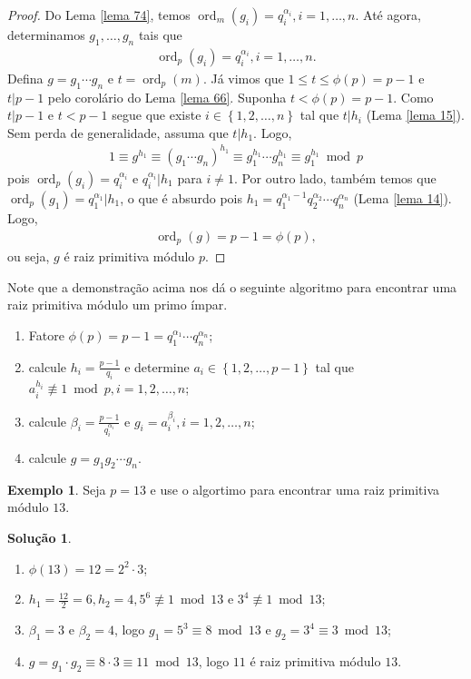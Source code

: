\documentclass[a4paper,11pt,twoside, leqno]{article}
\DeclareMathOperator{\Ord}{ord}
\theoremstyle{definition}
\newtheorem*{example}{Exemplo}
\newtheorem*{solution}{Solução}
\begin{document}
\begin{proof}
	Do Lema \eqref{lema 74}, temos $\Ord_m(g_i) = q_i^{\alpha_i}, i=1,\dots,n$. Até agora, determinamos $g_1, \dots, g_n$ tais que
	\begin{align*}
	\Ord_p(g_i) = q_i^{\alpha_i}, i=1,\dots,n.
	\end{align*}
	Defina $g = g_1\cdots g_n$ e $t = \Ord_p(m)$. Já vimos que $1\leq t\leq \phi(p) = p-1$ e $t|p-1$ pelo corolário do Lema \eqref{lema 66}. Suponha $t<\phi(p) = p-1$. Como $t|p-1$ e $t<p-1$ segue que existe $i\in\left\{ 1,2,\dots,n \right\}$ tal que $t|h_i$ (Lema \eqref{lema 15}). Sem perda de generalidade, assuma que $t|h_1$. Logo,
	\begin{align*}
	1\equiv g^{h_1}\equiv (g_1\cdots g_n)^{h_1}\equiv g_1^{h_1}\cdots g_n^{h_1}\equiv g_1^{h_1}\bmod p
	\end{align*}
	pois $\Ord_p(g_i) = q_i^{\alpha_i}$ e $q_i^{\alpha_i}|h_1$ para $i\neq 1$. Por outro lado, também temos que $\Ord_p(g_1) = q_1^{\alpha_1}|h_1$, o que é absurdo pois $h_1 = q_1^{\alpha_1 - 1}q_2^{\alpha_2}\cdots q_n^{\alpha_n}$ (Lema \eqref{lema 14}). Logo,
	\begin{align*}
	\Ord_p(g) = p-1 = \phi(p),
	\end{align*}
	ou seja, $g$ é raiz primitiva módulo $p$.
\end{proof}
Note que a demonstração acima nos dá o seguinte algoritmo para encontrar uma raiz primitiva módulo um primo ímpar.
\begin{enumerate}[(1)]
	\item Fatore $\phi(p) = p-1 = q_1^{\alpha_1}\cdots q_n^{\alpha_n}$;
	\item calcule $\displaystyle{ h_i = \frac{p-1}{q_i} }$ e determine $a_i\in\left\{ 1,2,\dots,p-1 \right\}$ tal que $a_i^{h_i}\not\equiv 1\bmod p, i=1,2,\dots,n$;
	\item calcule $\displaystyle{ \beta_i = \frac{p-1}{q_i^{\alpha_i}} }$ e $g_i = a_i^{\beta_i}, i=1,2,\dots,n$;
	\item calcule $g=g_1g_2\cdots g_n$.
\end{enumerate}
\begin{example}
	Seja $p=13$ e use o algortimo para encontrar uma raiz primitiva módulo $13$.
\end{example}
\begin{solution}
	\begin{enumerate}[(1)]
		\item $\phi(13) = 12 = 2^2\cdot 3$;
		\item $\displaystyle{ h_1 = \frac{12}{2} = 6, h_2 = 4, 5^6\not\equiv 1\bmod 13 \text{ e } 3^4\not\equiv 1\bmod 13 }$;
		\item $\beta_1 = 3$ e $\beta_2 = 4$, logo $g_1 = 5^3\equiv 8\bmod 13$ e $g_2 = 3^4\equiv 3\bmod 13$;
		\item $g = g_1\cdot g_2 \equiv 8\cdot 3\equiv 11\bmod 13$, logo $11$ é raiz primitiva módulo $13$.
	\end{enumerate}
\end{solution}
\end{document}

